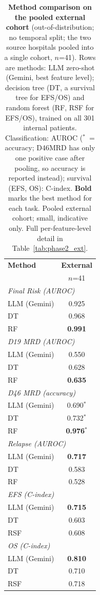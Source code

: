 \documentclass[pdflatex,sn-nature]{sn-jnl}
\begin{document}
\begin{table}[t]
\caption{\textbf{Method comparison on the pooled external cohort}
(out-of-distribution; no temporal split; the two source hospitals
pooled into a single cohort, $n$=41). Rows are methods: LLM zero-shot
(Gemini, best feature level); decision tree (DT, a survival tree for
EFS/OS) and random forest (RF, RSF for EFS/OS), trained on all 301
internal patients. Classification: AUROC ($^*$~= accuracy; D46MRD has
only one positive case after pooling, so accuracy is reported instead);
survival (EFS, OS): C-index. \textbf{Bold} marks the best method for
each task. Pooled external cohort; small, indicative only. Full
per-feature-level detail in Table~\ref{tab:phase2_ext}.}
\label{tab:phase2_ext_summary}
\centering
\small
\setlength{\tabcolsep}{7pt}
\begin{tabular}{@{}l c@{}}
\toprule
\textbf{Method} & \textbf{External} \\
 & \footnotesize $n$=41 \\
\midrule
\multicolumn{2}{l}{\textit{Final Risk (AUROC)}} \\
LLM (Gemini) & 0.925 \\
DT & 0.968 \\
RF & \textbf{0.991} \\
\multicolumn{2}{l}{\textit{D19 MRD (AUROC)}} \\
LLM (Gemini) & 0.550 \\
DT & 0.628 \\
RF & \textbf{0.635} \\
\multicolumn{2}{l}{\textit{D46 MRD (accuracy)}} \\
LLM (Gemini) & 0.690$^*$ \\
DT & 0.732$^*$ \\
RF & \textbf{0.976$^*$} \\
\multicolumn{2}{l}{\textit{Relapse (AUROC)}} \\
LLM (Gemini) & \textbf{0.717} \\
DT & 0.583 \\
RF & 0.528 \\
\multicolumn{2}{l}{\textit{EFS (C-index)}} \\
LLM (Gemini) & \textbf{0.715} \\
DT & 0.603 \\
RSF & 0.608 \\
\multicolumn{2}{l}{\textit{OS (C-index)}} \\
LLM (Gemini) & \textbf{0.810} \\
DT & 0.710 \\
RSF & 0.718 \\
\bottomrule
\end{tabular}
\end{table}
\end{document}
